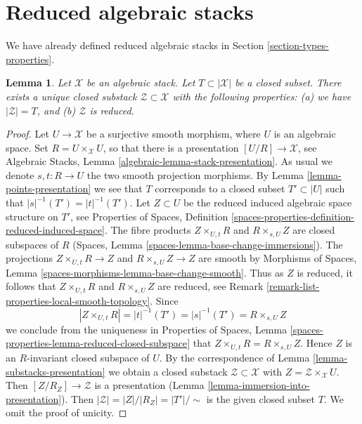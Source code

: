 \documentclass{stacks-project}
\theoremstyle{plain}
\newtheorem{lemma}[subsection]{Lemma}
\theoremstyle{definition}
\theoremstyle{remark}
\numberwithin{equation}{subsection}
\begin{document}
\section{Reduced algebraic stacks}
\label{section-reduced}

\noindent
We have already defined reduced algebraic stacks in
Section \ref{section-types-properties}.

\begin{lemma}
\label{lemma-reduced-closed-substack}
Let $\mathcal{X}$ be an algebraic stack.
Let $T \subset |\mathcal{X}|$ be a closed subset.
There exists a unique closed substack $\mathcal{Z} \subset \mathcal{X}$
with the following properties:
(a) we have $|\mathcal{Z}| = T$, and (b) $\mathcal{Z}$ is reduced.
\end{lemma}

\begin{proof}
Let $U \to \mathcal{X}$ be a surjective smooth morphism, where $U$ is an
algebraic space. Set $R = U \times_\mathcal{X} U$, so that there is a
presentation $[U/R] \to \mathcal{X}$, see
Algebraic Stacks, Lemma \ref{algebraic-lemma-stack-presentation}.
As usual we denote $s, t : R \to U$ the two smooth projection morphisms.
By Lemma \ref{lemma-points-presentation}
we see that $T$ corresponds to a closed subset $T' \subset |U|$ such
that $|s|^{-1}(T') = |t|^{-1}(T')$.
Let $Z \subset U$ be the reduced induced algebraic space
structure on $T'$, see
Properties of Spaces,
Definition \ref{spaces-properties-definition-reduced-induced-space}.
The fibre products
$Z \times_{U, t} R$ and $R \times_{s, U} Z$ are closed subspaces
of $R$
(Spaces, Lemma \ref{spaces-lemma-base-change-immersions}).
The projections $Z \times_{U, t} R \to Z$ and
$R \times_{s, U} Z \to Z$ are smooth by
Morphisms of Spaces, Lemma \ref{spaces-morphisms-lemma-base-change-smooth}.
Thus as $Z$ is reduced, it follows that
$Z \times_{U, t} R$ and $R \times_{s, U} Z$ are reduced, see
Remark \ref{remark-list-properties-local-smooth-topology}.
Since
$$
|Z \times_{U, t} R| = |t|^{-1}(T') = |s|^{-1}(T') = R \times_{s, U} Z
$$
we conclude from the uniqueness in
Properties of Spaces,
Lemma \ref{spaces-properties-lemma-reduced-closed-subspace}
that $Z \times_{U, t} R = R \times_{s, U} Z$.
Hence $Z$ is an $R$-invariant closed subspace of $U$.
By the correspondence of
Lemma \ref{lemma-substacks-presentation}
we obtain a closed substack $\mathcal{Z} \subset \mathcal{X}$
with $Z = \mathcal{Z} \times_\mathcal{X} U$. Then
$[Z/R_Z] \to \mathcal{Z}$ is a presentation
(Lemma \ref{lemma-immersion-into-presentation}).
Then $|\mathcal{Z}| = |Z|/|R_Z| = |T'|/\sim$ is the given
closed subset $T$. We omit the proof of unicity.
\end{proof}
\end{document}
